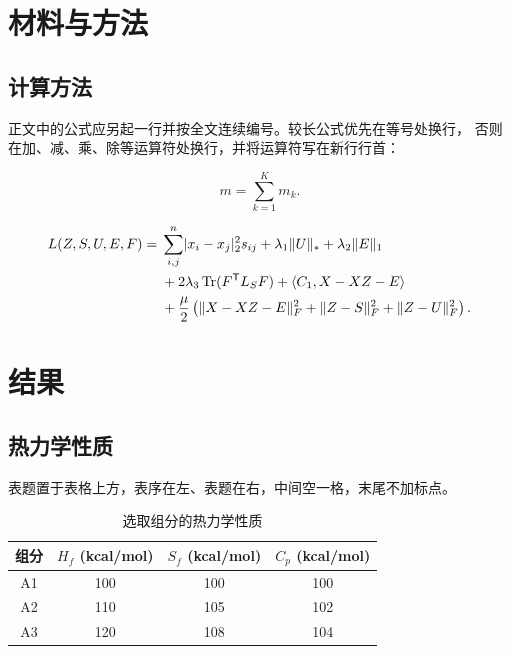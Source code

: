 \documentclass{techpaper2026}
\begin{document}
\section{材料与方法}

\subsection{计算方法}

正文中的公式应另起一行并按全文连续编号。较长公式优先在等号处换行，
否则在加、减、乘、除等运算符处换行，并将运算符写在新行行首：

\begin{equation}
  m=\sum_{k=1}^{K}m_k .
\end{equation}

\begin{align}
  L(Z,S,U,E,F)
    ={}& \sum_{i,j}^{n}\lvert x_i-x_j\rvert_2^2s_{ij}
       +\lambda_1\lVert U\rVert_*
       +\lambda_2\lVert E\rVert_1 \notag\\
     &+2\lambda_3\operatorname{Tr}(F^{\mathsf T}L_SF)
       +\langle C_1,X-XZ-E\rangle \notag\\
     &+\frac{\mu}{2}\left(
       \lVert X-XZ-E\rVert_F^2+
       \lVert Z-S\rVert_F^2+
       \lVert Z-U\rVert_F^2\right).
\end{align}

\section{结果}

\subsection{热力学性质}

表题置于表格上方，表序在左、表题在右，中间空一格，末尾不加标点。

\begin{table}[htbp]
  \centering
  \caption{选取组分的热力学性质}
  \label{tab:properties}
  \begin{tabular}{cccc}
    \toprule
    组分 & $H_f$ (kcal/mol) & $S_f$ (kcal/mol) & $C_p$ (kcal/mol) \\
    \midrule
    A1 & 100 & 100 & 100 \\
    A2 & 110 & 105 & 102 \\
    A3 & 120 & 108 & 104 \\
    \bottomrule
  \end{tabular}
\end{table}
\end{document}
